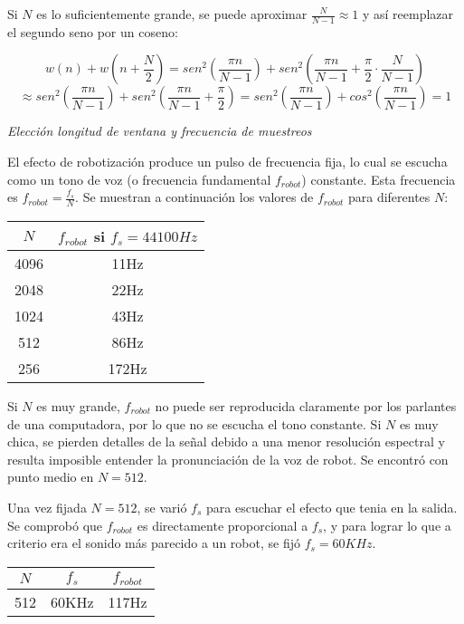 \documentclass[../ASSD_TP2.tex]{subfiles}
\begin{document}
Si $N$ es lo suficientemente grande, se puede aproximar $\frac{N}{N-1}\approx 1$ y as\'i reemplazar el segundo seno por un coseno:

\[w(n) + w\left(n+\frac{N}{2}\right) = sen^2\left( \frac{\pi n}{N-1}\right)  + sen^2\left( \frac{\pi n}{N-1} + \frac{\pi}{2}\cdot \frac{N}{N-1}\right) \]
\begin{equation}
\approx sen^2\left( \frac{\pi n}{N-1}\right)  + sen^2\left( \frac{\pi n}{N-1} + \frac{\pi}{2} \right) = sen^2\left( \frac{\pi n}{N-1}\right) + cos^2\left( \frac{\pi n}{N-1}\right) = 1
\end{equation}

\textit{Elecci\'on longitud de ventana y frecuencia de muestreos}

El efecto de robotizaci\'on produce un pulso de frecuencia fija, lo cual se escucha como un tono de voz (o frecuencia fundamental $f_{robot}$) constante. Esta frecuencia es $f_{robot} = \frac{f_s}{N}$. Se muestran a continuaci\'on los valores de $f_{robot}$ para diferentes $N$:
\begin{center}
	\begin{tabular}{|c|c|}
	\hline 
	$N$ & $f_{robot}$ si $f_s = 44100Hz$ \\ 
	\hline 
	4096 & 11Hz \\ 
	\hline 
	2048 & 22Hz \\ 
	\hline 
	1024 & 43Hz \\ 
	\hline 
	512 & 86Hz \\ 
	\hline 
	256 & 172Hz \\ 
	\hline 
	\end{tabular} 
\end{center}

Si $N$ es muy grande, $f_{robot}$ no puede ser reproducida claramente por los parlantes de una computadora, por lo que no se escucha el tono constante. Si $N$ es muy chica, se pierden detalles de la se\~nal debido a una menor resoluci\'on espectral y resulta imposible entender la pronunciaci\'on de la voz de robot. Se encontr\'o con punto medio en $N=512$. 

Una vez fijada $N=512$, se vari\'o $f_s$ para escuchar el efecto que tenia en la salida. Se comprob\'o que $f_{robot}$ es directamente proporcional a $f_s$, y para lograr lo que a criterio era el sonido m\'as parecido a un robot, se fij\'o $f_s = 60KHz$. 


\begin{center}
	\begin{tabular}{|c|c|c|}
	\hline 
	$N$ & $f_s$ & $f_{robot}$ \\ 
	\hline 
	512 & 60KHz & 117Hz \\ 
	\hline 
	\end{tabular} 
\end{center}
\end{document}
